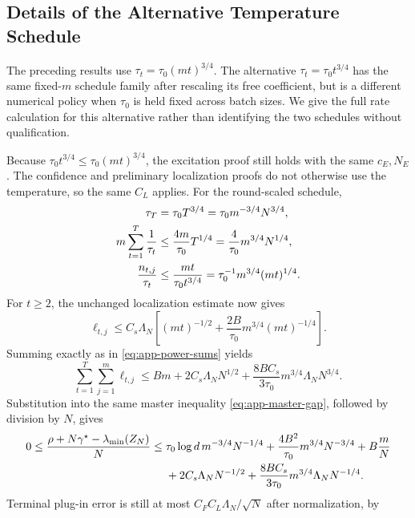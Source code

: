\documentclass[10pt,twoside,letterpaper]{article}
\begin{document}
\subsection{Details of the Alternative Temperature Schedule}
\label{app:temperature}

The preceding results use $\tau_t=\tau_0(mt)^{3/4}$. The alternative
$\tau_t=\tau_0t^{3/4}$ has the same fixed-$m$ schedule family after
rescaling its free coefficient, but is a different numerical policy
when $\tau_0$ is held fixed across batch sizes. We give the full rate
calculation for this alternative rather than identifying the two
schedules without qualification.

Because $\tau_0t^{3/4}\le\tau_0(mt)^{3/4}$, the excitation proof still
holds with the same $c_E,N_E$. The confidence and preliminary
localization proofs do not otherwise use the temperature, so the
same $C_L$ applies. For the round-scaled schedule,
\begin{align}
\tau_T&=\tau_0T^{3/4}=\tau_0m^{-3/4}N^{3/4},\notag\\
m\sum_{t=1}^T\frac1{\tau_t}
&\le\frac{4m}{\tau_0}T^{1/4}
=\frac4{\tau_0}m^{3/4}N^{1/4},\notag\\
\frac{n_{t,j}}{\tau_t}
&\le\frac{mt}{\tau_0t^{3/4}}
=\tau_0^{-1}m^{3/4}(mt)^{1/4}.
\label{eq:app-round-scaled-components}
\end{align}
For $t\ge2$, the unchanged localization estimate now gives
\begin{equation}
\ell_{t,j}\le C_s\Lambda_N
\left[(mt)^{-1/2}+\frac{2B}{\tau_0}m^{3/4}(mt)^{-1/4}\right].
\label{eq:app-round-scaled-loss}
\end{equation}
Summing exactly as in \eqref{eq:app-power-sums} yields
\begin{equation}
\sum_{t=1}^T\sum_{j=1}^m\ell_{t,j}
\le Bm+2C_s\Lambda_NN^{1/2}
+\frac{8BC_s}{3\tau_0}m^{3/4}\Lambda_NN^{3/4}.
\label{eq:app-round-scaled-loss-sum}
\end{equation}
Substitution into the same master inequality
\eqref{eq:app-master-gap}, followed by division by $N$, gives
\begin{align}
0\le\frac{\rho+N\gamma^\star-\lambda_{\min}(Z_N)}N
\le{}&\tau_0\log d\,m^{-3/4}N^{-1/4}
+\frac{4B^2}{\tau_0}m^{3/4}N^{-3/4}+B\frac mN\notag\\
&+2C_s\Lambda_NN^{-1/2}
+\frac{8BC_s}{3\tau_0}m^{3/4}\Lambda_NN^{-1/4}.
\label{eq:app-round-scaled-decomposition}
\end{align}
Terminal plug-in error is still at most
$C_FC_L\Lambda_N/\sqrt N$ after normalization, by
\end{document}
